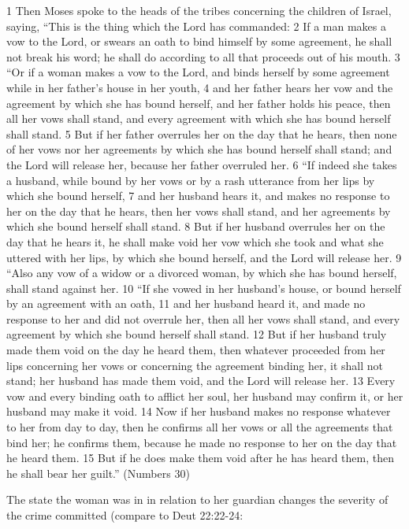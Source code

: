 \documentclass[11pt]{article}
\begin{document}
{1 Then Moses spoke to the heads of the tribes concerning the children of Israel, saying, “This is the thing which the Lord has commanded: 2 If a man makes a vow to the Lord, or swears an oath to bind himself by some agreement, he shall not break his word; he shall do according to all that proceeds out of his mouth.
3 “Or if a woman makes a vow to the Lord, and binds herself by some agreement while in her father’s house in her youth, 4 and her father hears her vow and the agreement by which she has bound herself, and her father holds his peace, then all her vows shall stand, and every agreement with which she has bound herself shall stand. 5 But if her father overrules her on the day that he hears, then none of her vows nor her agreements by which she has bound herself shall stand; and the Lord will release her, because her father overruled her.
6 “If indeed she takes a husband, while bound by her vows or by a rash utterance from her lips by which she bound herself, 7 and her husband hears it, and makes no response to her on the day that he hears, then her vows shall stand, and her agreements by which she bound herself shall stand. 8 But if her husband overrules her on the day that he hears it, he shall make void her vow which she took and what she uttered with her lips, by which she bound herself, and the Lord will release her.
9 “Also any vow of a widow or a divorced woman, by which she has bound herself, shall stand against her.
10 “If she vowed in her husband’s house, or bound herself by an agreement with an oath, 11 and her husband heard it, and made no response to her and did not overrule her, then all her vows shall stand, and every agreement by which she bound herself shall stand. 12 But if her husband truly made them void on the day he heard them, then whatever proceeded from her lips concerning her vows or concerning the agreement binding her, it shall not stand; her husband has made them void, and the Lord will release her. 13 Every vow and every binding oath to afflict her soul, her husband may confirm it, or her husband may make it void. 14 Now if her husband makes no response whatever to her from day to day, then he confirms all her vows or all the agreements that bind her; he confirms them, because he made no response to her on the day that he heard them. 15 But if he does make them void after he has heard them, then he shall bear her guilt.” (Numbers 30)

The state the woman was in in relation to her guardian changes the severity of the crime committed (compare to Deut 22:22-24:

}
\end{document}

